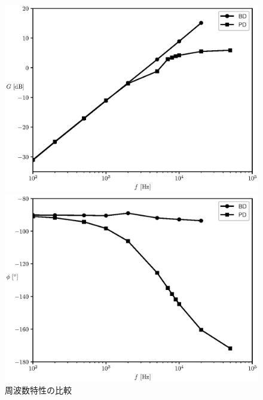 \documentclass[titlepage]{jsarticle}
\begin{document}
            \begin{figure}[h]
                \begin{minipage}{0.5\hsize}
                    \centering
                    \includegraphics[width=1.1\hsize]{img/dif-com-graph1.eps}
                \end{minipage}
                \begin{minipage}{0.5\hsize}
                    \centering
                    \includegraphics[width=1.1\hsize]{img/dif-com-graph2.eps}
                \end{minipage}
                \caption{周波数特性の比較}
                \label{fig:dif-com-graph}
            \end{figure}
\end{document}
